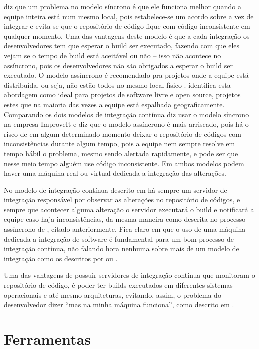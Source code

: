 \documentclass[10pt,a4paper,font=plain]{abnt}
\begin{document}
 diz que um problema no modelo síncrono é que ele funciona melhor quando a equipe inteira está num mesmo local, pois estabelece-se um acordo sobre a vez de integrar e evita-se que o repositório de código fique com código inconsistente em qualquer momento. Uma das vantagens deste modelo é que a cada integração os desenvolvedores tem que esperar o build ser executado, fazendo com que eles vejam se o tempo de build está aceitável ou não -- isso não acontece no assíncrono, pois os desenvolvedores não são obrigados a esperar o build ser executado.
O modelo assíncrono é recomendado pra projetos onde a equipe está distribuída, ou seja, não estão todos no mesmo local físico \cite{Teles}.  identifica esta abordagem como ideal para projetos de software livre e open source, projetos estes que na maioria das vezes a equipe está espalhada geograficamente.
Comparando os dois modelos de integração contínua  diz usar o modelo síncrono na empresa ImproveIt e diz que o modelo assíncrono é mais arriscado, pois há o risco de em algum determinado momento deixar o repositório de códigos com inconsistências durante algum tempo, pois a equipe nem sempre resolve em tempo hábil o problema, mesmo sendo alertada rapidamente, e pode ser que nesse meio tempo alguém use código inconsistente.
Em ambos modelos podem haver uma máquina real ou virtual dedicada a integração das alterações.

No modelo de integração contínua descrito em \cite{CI} há sempre um servidor de integração responsável por observar as alterações no repositório de códigos, e sempre que acontecer alguma alteração o servidor executará o build e notificará a equipe caso haja inconsistências, da mesma maneira como descrita no processo assíncrono de , citado anteriormente. Fica claro em \cite{CI} que o uso de uma máquina dedicada a integração de software é fundamental para um bom processo de integração contínua, não falando hora nenhuma sobre mais de um modelo de integração como os descritos por  ou .

Uma das vantagens de possuir servidores de integração contínua que monitoram o repositório de código, é poder ter builds executados em diferentes sistemas operacionais e até mesmo arquiteturas, evitando, assim, o problema do desenvolvedor dizer ``mas na minha máquina funciona'', como descrito em \cite{Kniberg}.

\section{Ferramentas}
\end{document}
